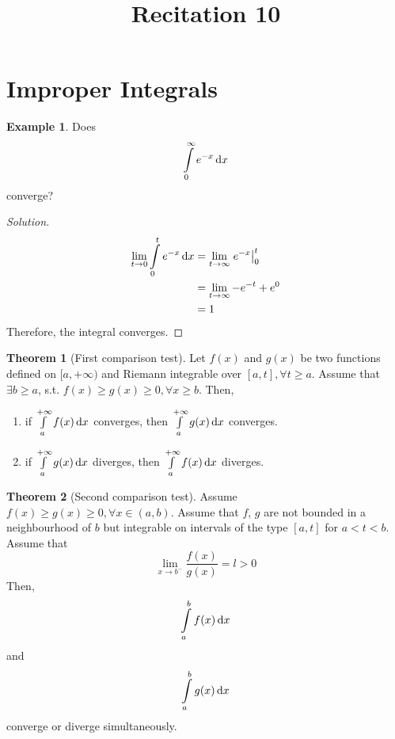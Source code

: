 \documentclass[fleqn, 12pt]{article}
\title{Recitation 10}
\author{}
\date{\formatdate{31}{12}{2014}}
\theoremstyle{definition}
\newtheorem{example}{Example}
\theoremstyle{theorem}
\newtheorem{theorem}{Theorem}
\newenvironment{solution}
{\begin{proof}[Solution]\let\qed\relax}
	{\end{proof}}
\begin{document}
\maketitle

\tableofcontents

\newpage
\section{Improper Integrals}

\begin{example}
	Does \[\int\limits_{0}^{\infty} e^{-x} \dif x\]  converge?
\end{example}

\begin{solution}
	\begin{align*}
		\lim\limits_{t \to 0} \int\limits_{0}^{t} e^{-x} \dif x &= \lim\limits_{t \to \infty} \left. e^{-x} \right\rvert_{0}^{t}\\
		&= \lim\limits_{t \to \infty} -e^{-t} + e^0\\
		&= 1
	\end{align*}
	Therefore, the integral converges.
\end{solution}

\begin{theorem}[First comparison test]
	Let $f(x)$ and $g(x)$ be two functions defined on $[a, +\infty)$ and Riemann integrable over $[a, t], \forall t \geq a$. Assume that $\exists b \geq a$, s.t. $f(x) \geq g(x) \geq 0, \forall x \geq b$. Then,
	\begin{enumerate}
		\item if $\int\limits_{a}^{+\infty} f(x) \dif x$ converges, then $\int\limits_{a}^{+\infty} g(x) \dif x$ converges.
		\item if $\int\limits_{a}^{+\infty} g(x) \dif x$ diverges, then $\int\limits_{a}^{+\infty} f(x) \dif x$ diverges.
	\end{enumerate}
\end{theorem}

\begin{theorem}[Second comparison test]
	Assume $f(x) \geq g(x) \geq 0, \forall x \in (a,b)$. Assume that $f$, $g$ are not bounded in a neighbourhood of $b$ but integrable on intervals of the type $[a, t]$ for $a < t < b$. Assume that 
	\begin{equation*}
		\lim\limits_{x \to b^-} \dfrac{f(x)}{g(x)} = l > 0
	\end{equation*}
	Then, \[\int\limits_{a}^{b} f(x) \dif x\]and \[\int\limits_{a}^{b} g(x) \dif x\] converge or diverge simultaneously.
\end{theorem}
\end{document}
